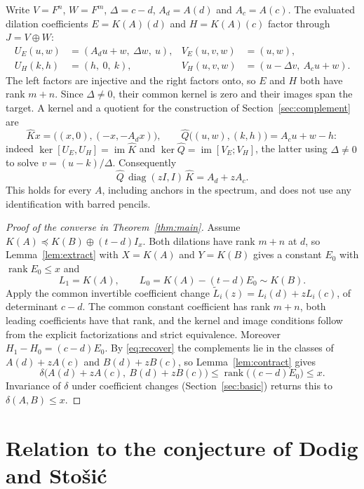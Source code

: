 \documentclass[11pt]{article}
\newcommand{\rk}{\operatorname{rank}}
\newcommand{\im}{\operatorname{im}}
\newcommand{\cmp}{\preceq}
\begin{document}
Write $V=F^n$, $W=F^m$, $\Delta=c-d$, $A_d=A(d)$ and $A_c=A(c)$. The evaluated dilation coefficients $E=K(A)(d)$ and $H=K(A)(c)$ factor through $J=V\oplus W$:
\begin{align*}
U_E(u,w)&=(A_du+w,\ \Delta w,\ u), & V_E(u,v,w)&=(u,w),\\
U_H(k,h)&=(h,\ 0,\ k), & V_H(u,v,w)&=(u-\Delta v,\ A_cu+w).
\end{align*}
The left factors are injective and the right factors onto, so $E$ and $H$ both have rank $m+n$. Since $\Delta\ne0$, their common kernel is zero and their images span the target. A kernel and a quotient for the construction of Section~\ref{sec:complement} are
\[
\widehat K x=\bigl((x,0),(-x,-A_dx)\bigr),\qquad \widehat Q\bigl((u,w),(k,h)\bigr)=A_cu+w-h:
\]
indeed $\ker[U_E,U_H]=\im\widehat K$ and $\ker\widehat Q=\im[V_E;V_H]$, the latter using $\Delta\ne0$ to solve $v=(u-k)/\Delta$. Consequently
\begin{equation}\label{eq:recover}
\widehat Q\,\operatorname{diag}(zI,I)\,\widehat K=A_d+zA_c .
\end{equation}
This holds for every $A$, including anchors in the spectrum, and does not use any identification with barred pencils.

\begin{proof}[Proof of the converse in Theorem~\ref{thm:main}]
Assume $K(A)\cmp K(B)\oplus(t-d)I_x$. Both dilations have rank $m+n$ at $d$, so Lemma~\ref{lem:extract} with $X=K(A)$ and $Y=K(B)$ gives a constant $E_0$ with $\rk E_0\le x$ and
\[
L_1=K(A),\qquad L_0=K(A)-(t-d)E_0\sim K(B).
\]
Apply the common invertible coefficient change $\widetilde L_i(z)=L_i(d)+zL_i(c)$, of determinant $c-d$. The common constant coefficient has rank $m+n$, both leading coefficients have that rank, and the kernel and image conditions follow from the explicit factorizations and strict equivalence. Moreover $H_1-H_0=(c-d)E_0$. By \eqref{eq:recover} the complements lie in the classes of $A(d)+zA(c)$ and $B(d)+zB(c)$, so Lemma~\ref{lem:contract} gives
\[
\delta\bigl(A(d)+zA(c),\ B(d)+zB(c)\bigr)\le\rk\bigl((c-d)E_0\bigr)\le x .
\]
Invariance of $\delta$ under coefficient changes (Section~\ref{sec:basic}) returns this to $\delta(A,B)\le x$.
\end{proof}

\section{Relation to the conjecture of Dodig and Sto\v{s}i\'c}\label{sec:conjecture}
\end{document}
